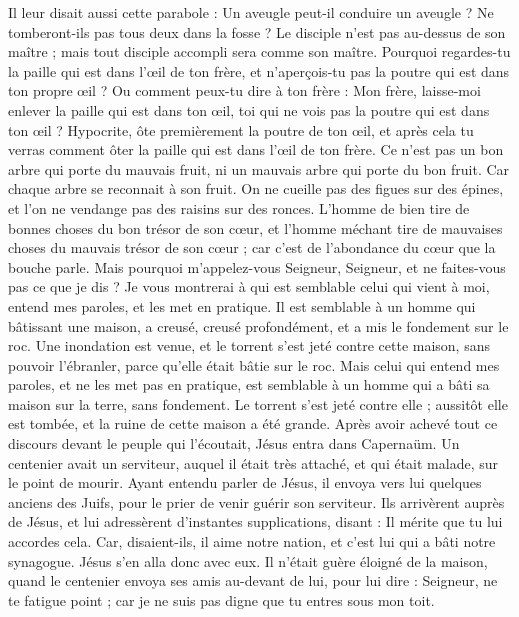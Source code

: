 \begin{multicols}{2}
Il leur disait aussi cette parabole : Un aveugle peut-il conduire un aveugle ? Ne tomberont-ils pas tous deux dans la fosse ?
Le disciple n'est pas au-dessus de son maître ; mais tout disciple accompli sera comme son maître.
Pourquoi regardes-tu la paille qui est dans l’œil de ton frère, et n’aperçois-tu pas la poutre qui est dans ton propre œil ?
Ou comment peux-tu dire à ton frère : Mon frère, laisse-moi enlever la paille qui est dans ton œil, toi qui ne vois pas la poutre qui est dans ton œil ? Hypocrite, ôte premièrement la poutre de ton œil, et après cela tu verras comment ôter la paille qui est dans l’œil de ton frère.
Ce n’est pas un bon arbre qui porte du mauvais fruit, ni un mauvais arbre qui porte du bon fruit.
Car chaque arbre se reconnait à son fruit. On ne cueille pas des figues sur des épines, et l’on ne vendange pas des raisins sur des ronces.
L'homme de bien tire de bonnes choses du bon trésor de son cœur, et l'homme méchant tire de mauvaises choses du mauvais trésor de son cœur ; car c'est de l'abondance du cœur que la bouche parle.
Mais pourquoi m'appelez-vous Seigneur, Seigneur, et ne faites-vous pas ce que je dis ?
Je vous montrerai à qui est semblable celui qui vient à moi, entend mes paroles, et les met en pratique.
Il est semblable à un homme qui bâtissant une maison, a creusé, creusé profondément, et a mis le fondement sur le roc. Une inondation est venue, et le torrent s’est jeté contre cette maison, sans pouvoir l’ébranler, parce qu’elle était bâtie sur le roc.
Mais celui qui entend mes paroles, et ne les met pas en pratique, est semblable à un homme qui a bâti sa maison sur la terre, sans fondement. Le torrent s’est jeté contre elle ; aussitôt elle est tombée, et la ruine de cette maison a été grande.
\VerseOne{}Après avoir achevé tout ce discours devant le peuple qui l'écoutait, Jésus entra dans Capernaüm.
Un centenier avait un serviteur, auquel il était très attaché, et qui était malade, sur le point de mourir.
Ayant entendu parler de Jésus, il envoya vers lui quelques anciens des Juifs, pour le prier de venir guérir son serviteur.
Ils arrivèrent auprès de Jésus, et lui adressèrent d’instantes supplications, disant : Il mérite que tu lui accordes cela.
Car, disaient-ils, il aime notre nation, et c’est lui qui a bâti notre synagogue.
Jésus s'en alla donc avec eux. Il n’était guère éloigné de la maison, quand le centenier envoya ses amis au-devant de lui, pour lui dire : Seigneur, ne te fatigue point ; car je ne suis pas digne que tu entres sous mon toit.

\end{multicols}
